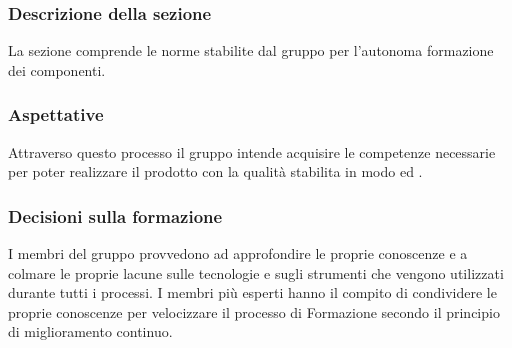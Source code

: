 \subsubsection{Descrizione della sezione}
La sezione comprende le norme stabilite dal gruppo per l'autonoma formazione dei componenti.
\subsubsection{Aspettative}
Attraverso questo processo il gruppo intende acquisire le competenze necessarie per poter realizzare il prodotto con la qualità stabilita in modo  ed .
\subsubsection{Decisioni sulla formazione}\label{DecisioniFormazione}
I membri del gruppo provvedono ad approfondire le proprie conoscenze e a colmare le proprie lacune sulle tecnologie e sugli strumenti che vengono utilizzati durante tutti i processi. I membri più esperti hanno il compito di condividere le proprie conoscenze per velocizzare il processo di Formazione secondo il principio di miglioramento continuo.